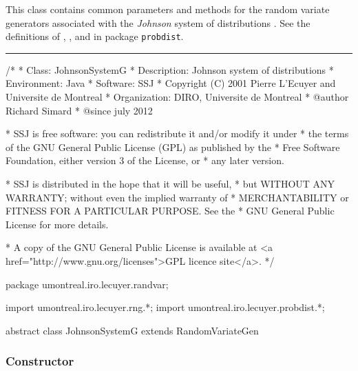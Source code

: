 
This class contains common parameters and methods for
the random variate generators associated with
the {\em Johnson} system of distributions \cite{tJOH49a,tJOH95a}.
See the definitions of
,
, and
in package \texttt{probdist}.



\bigskip\hrule

\begin{code}
\begin{hide}
/*
 * Class:        JohnsonSystemG
 * Description:  Johnson system of distributions
 * Environment:  Java
 * Software:     SSJ
 * Copyright (C) 2001  Pierre L'Ecuyer and Universite de Montreal
 * Organization: DIRO, Universite de Montreal
 * @author       Richard Simard
 * @since        july 2012

 * SSJ is free software: you can redistribute it and/or modify it under
 * the terms of the GNU General Public License (GPL) as published by the
 * Free Software Foundation, either version 3 of the License, or
 * any later version.

 * SSJ is distributed in the hope that it will be useful,
 * but WITHOUT ANY WARRANTY; without even the implied warranty of
 * MERCHANTABILITY or FITNESS FOR A PARTICULAR PURPOSE.  See the
 * GNU General Public License for more details.

 * A copy of the GNU General Public License is available at
   <a href="http://www.gnu.org/licenses">GPL licence site</a>.
 */
\end{hide}
package umontreal.iro.lecuyer.randvar;\begin{hide}
import umontreal.iro.lecuyer.rng.*;
import umontreal.iro.lecuyer.probdist.*;
\end{hide}


abstract class JohnsonSystemG extends RandomVariateGen\begin{hide} {
   protected double gamma;
   protected double delta;
   protected double xi;
   protected double lambda;\end{hide}
\end{code}

\subsubsection* {Constructor}

